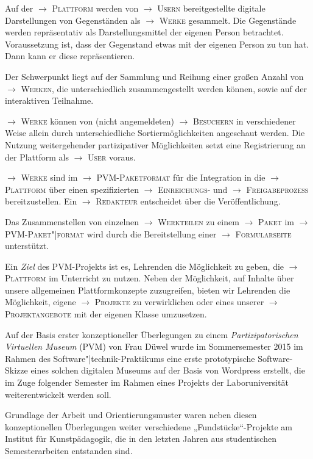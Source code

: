 \documentclass[a4paper,11pt]{article}
\newcommand{\glossar}[1]{{$\to$ \textsc{#1}}}
\begin{document}
Auf der \glossar{Plattform} werden von \glossar{Usern} bereitgestellte digitale
Darstellungen von Gegenständen als \glossar{Werke} gesammelt. Die Gegenstände
werden repräsentativ als Darstellungsmittel der eigenen Person betrachtet.
Voraussetzung ist, dass der Gegenstand etwas mit der eigenen Person zu tun hat.
Dann kann er diese repräsentieren.

Der Schwerpunkt liegt auf der Sammlung und Reihung einer großen Anzahl von
\glossar{Werken}, die unterschiedlich zusammengestellt werden können, sowie auf
der interaktiven Teilnahme. 

\glossar{Werke} können von (nicht angemeldeten) \glossar{Besuchern} in
verschiedener Weise allein durch unterschiedliche Sortiermöglichkeiten
angeschaut werden.  Die Nutzung weitergehender partizipativer Möglichkeiten
setzt eine Registrierung an der Plattform als \glossar{User} voraus.

\glossar{Werke} sind im \glossar{PVM-Paketformat} für die Integration in die
\glossar{Plattform} über einen spezifizierten \glossar{Einreichungs}- und
\glossar{Freigabeprozess} bereitzustellen. Ein \glossar{Redakteur} entscheidet
über die Veröffentlichung.

Das Zusammenstellen von einzelnen \glossar{Werkteilen} zu einem \glossar{Paket}
im \glossar{PVM-Paket"|format} wird durch die Bereitstellung einer
\glossar{Formularseite} unterstützt.

Ein \emph{Ziel} des PVM-Projekts ist es, Lehrenden die Möglichkeit zu geben,
die \glossar{Plattform} im Unterricht zu nutzen.  Neben der Möglichkeit, auf
Inhalte über unsere allgemeinen Plattformkonzepte zuzugreifen, bieten wir
Lehrenden die Möglichkeit, eigene \glossar{Projekte} zu verwirklichen oder
eines unserer \glossar{Projektangebote} mit der eigenen Klasse umzusetzen.

Auf der Basis erster konzeptioneller Überlegungen zu einem
\emph{Partizipatorischen Virtuellen Museum} (PVM) von Frau Düwel wurde im
Sommersemester 2015 im Rahmen des Software"|technik-Praktikums eine erste
prototypische Software-Skizze eines solchen digitalen Museums auf der Basis von
Wordpress erstellt, die im Zuge folgender Semester im Rahmen eines Projekts der
Laboruniversität weiterentwickelt werden soll.

Grundlage der Arbeit und Orientierungsmuster waren neben diesen konzeptionellen
Überlegungen weiter verschiedene „Fundstücke“-Projekte am Institut für
Kunstpädagogik, die in den letzten Jahren aus studentischen Semesterarbeiten
entstanden sind.
\end{document}
